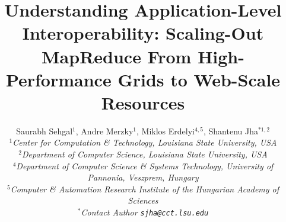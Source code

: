 \documentclass[3p,twocolumn]{elsarticle}
\begin{document}
\title{Understanding Application-Level Interoperability: Scaling-Out
  MapReduce From High-Performance Grids to Web-Scale Resources}

     \author{Saurabh Sehgal$^1$, Andre Merzky$^{1}$, Miklos
       Erdelyi$^{4,5}$, Shantenu Jha$^{*1,2}$
       \\
       \small{\emph{$^{1}$Center for Computation \& Technology, Louisiana State University, USA}}\\
       \small{\emph{$^{2}$Department of Computer Science, Louisiana State University, USA}}\\
       \small{\emph{$^{4}$Department of Computer Science \& Systems
           Technology, University of
           Pannonia, Veszprem, Hungary}}\\
       \small{\emph{$^{5}$Computer \& Automation Research Institute of
           the Hungarian Academy of
           Sciences}}\\
       \small{\emph{$^{*}$Contact Author \texttt{sjha@cct.lsu.edu}}} 
       }

\newif\ifdraft
\draftfalse
\ifdraft
 \newcommand{\amnote}[1]{     {\textcolor{magenta} { ***AM: #1 }}}
 \newcommand{\jhanote}[1]{    {\textcolor{red}     { ***SJ: #1 }}}
 \newcommand{\miklosnote}[1]{ {\textcolor{blue}    { ***ME: #1 }}}
 \newcommand{\ssnote}[1]{     {\textcolor{blue}    { ***SS: #1 }}}
\else
 \newcommand{\amnote}[1]{}
 \newcommand{\jhanote}[1]{}
 \newcommand{\miklosnote}[1]{}
 \newcommand{\ssnote}[1]{}
\fi

\newcommand{\sagamapreduce}{SAGA-MapReduce\xspace}
\newcommand{\smr}{\sagamapreduce}
\newcommand{\mr}{MapReduce\xspace}
\newcommand{\tc}{$T_c$\xspace}
\newcommand{\wc}{wordcount\xspace}
\newcommand{\Wc}{Wordcount\xspace}

\newcommand{\uppp}{\vspace*{-1em}}
\newcommand{\upp}{\vspace*{-0.66em}}
\newcommand{\up}{\vspace*{-0.33em}}
\newcommand{\shift}{\hspace*{1.00em}}

\newcommand{\T}[1]{\texttt{#1}}
\newcommand{\I}[1]{\textit{#1}}
\newcommand{\B}[1]{\textbf{#1}}
\newcommand{\F}[1]{\B{[FIXME: #1]}}
\newcommand{\TODO}[1]{\textcolor{red}{\B{TODO: #1}}}

\newcommand{\ssh}[1]{\T{ssh}\xspace}
\newcommand{\scp}[1]{\T{scp}\xspace}
\newcommand{\sshfs}[1]{\T{sshfs}\xspace}
 
\end{document}
